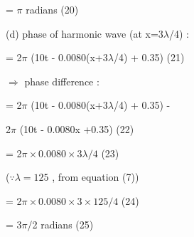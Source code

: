 \documentclass[journal,12pt,twocolumn]{IEEEtran}
\theoremstyle{remark}
\begin{document}
= $\pi$ radians \hspace{5.5cm} (20)

\vspace{0.5cm}
(d) phase of harmonic wave (at x=$3\lambda$/4) :

= 2$\pi$ (10t - 0.0080(x+$3\lambda$/4) + 0.35) \hspace{1.5cm} (21)

$\Rightarrow$  phase difference :

= 2$\pi$ (10t - 0.0080(x+$3\lambda$/4) + 0.35) -

2$\pi$ (10t - 0.0080x  +0.35) \hspace{3cm} (22)

= 2$\pi \times 0.0080 \times 3\lambda/4$ \hspace{3.6cm} (23)

($\because \lambda = 125$ , from equation (7))

= 2$\pi \times 0.0080 \times 3 \times125/4$ \hspace{2.7cm} (24)

= $3\pi$/2 radians \hspace{4.8cm} (25)
\end{document}
